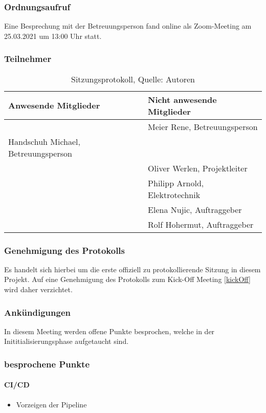 \subsubsection{Ordnungsaufruf}
Eine Besprechung mit der Betreuungsperson fand online als Zoom-Meeting am 25.03.2021 um 13:00 Uhr statt.
\subsubsection{Teilnehmer}
\begin{table}[H]
	\setlength\extrarowheight{2pt} %
	\begin{tabularx}{\textwidth}{|X|X|}
		\hline
		\textbf{Anwesende Mitglieder} &  \textbf{Nicht anwesende Mitglieder} \\
		\hline
		& Meier Rene, Betreuungsperson  \\
		Handschuh Michael, Betreuungsperson &   \\
		&Oliver Werlen, Projektleiter \\
		&Philipp Arnold, Elektrotechnik \\
		&Elena Nujic, Auftraggeber \\
		&Rolf Hohermut, Auftraggeber \\
		\hline
	\end{tabularx}
	\caption{ \label{tbl: Teilnehmerliste vom 25.03.2021}Sitzungsprotokoll, Quelle: Autoren}
\end{table}
\subsubsection{Genehmigung des Protokolls}
Es handelt sich hierbei um die erste offiziell zu protokollierende Sitzung in diesem Projekt. Auf eine Genehmigung des Protokolls zum Kick-Off Meeting \ref{kickOff} wird daher verzichtet. 
\subsubsection{Ankündigungen}
In diesem Meeting werden offene Punkte besprochen, welche in der Inititialisierungsphase aufgetaucht sind. 
\subsubsection{besprochene Punkte}
\paragraph{CI/CD}
\begin{itemize}
	\item Vorzeigen der Pipeline
\end{itemize}
